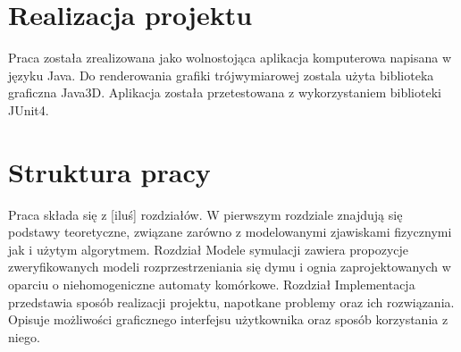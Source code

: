 
\section {Realizacja projektu} %
Praca została zrealizowana jako wolnostojąca aplikacja komputerowa napisana w języku Java. Do renderowania grafiki trójwymiarowej
zostala użyta biblioteka graficzna Java3D. Aplikacja została przetestowana z wykorzystaniem biblioteki JUnit4. 

\section{Struktura pracy} %
Praca składa się z [iluś] rozdziałów. 
W pierwszym rozdziale znajdują się podstawy teoretyczne, związane zarówno z modelowanymi zjawiskami fizycznymi jak i użytym algorytmem.
Rozdział Modele symulacji zawiera propozycje zweryfikowanych modeli rozprzestrzeniania się dymu i ognia zaprojektowanych w oparciu
o niehomogeniczne automaty komórkowe. Rozdział Implementacja przedstawia sposób realizacji projektu, napotkane problemy oraz 
ich rozwiązania. Opisuje możliwości graficznego interfejsu użytkownika oraz sposób korzystania z niego.
